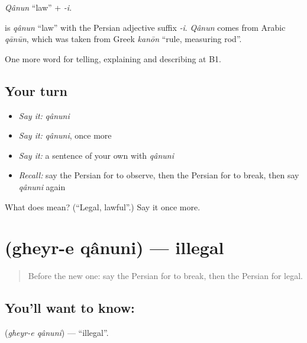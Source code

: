 \emph{Qânun} \textquotedblleft{}law\textquotedblright{} + \emph{-i}.

\begin{cousinweb}
\textbf{} is \emph{qânun} \textquotedblleft{}law\textquotedblright{} with the Persian adjective suffix \emph{-i}. \emph{Qânun} comes from Arabic \emph{qānūn}, which was taken from Greek \emph{kanōn} \textquotedblleft{}rule, measuring rod\textquotedblright{}.
\end{cousinweb}

\begin{grammarlens}[title={What you've built}]
One more word for telling, explaining and describing at B1.
\end{grammarlens}

\subsection*{Your turn}
\begin{itemize}
\raggedright
  \item \emph{Say it:} \emph{qânuni}
  \item \emph{Say it:} \emph{qânuni}, once more
  \item \emph{Say it:} a sentence of your own with \emph{qânuni}
  \item \emph{Recall:} say the Persian for to observe, then the Persian for to break, then say \emph{qânuni} again
\end{itemize}

\begin{tcolorbox}[breakable,colback=teal!4,colframe=teal!35!black,title={Before you move on}]
What does  mean? (\textquotedblleft{}Legal, lawful\textquotedblright{}.) Say it once more.
\end{tcolorbox}
\section[\texorpdfstring{\fa{غیرقانونی} (gheyr-e qânuni)}{غیرقانونی (gheyr-e qânuni)}]{ (gheyr-e qânuni) — illegal}

\label{lesson:FA-C405-gheyr-e-qanuni}



\begin{quote}
Before the new one: say the Persian for to break, then the Persian for legal.
\end{quote}

\subsection*{You'll want to know: }
\textbf{} (\emph{gheyr-e qânuni}) — \textquotedblleft{}illegal\textquotedblright{}.


